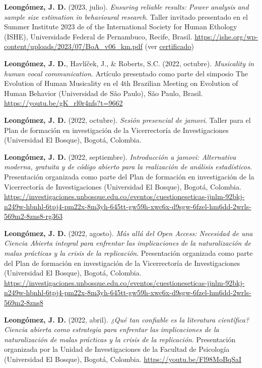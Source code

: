 \documentclass[11pt,a4paper,]{awesome-cv}
\begin{document}
\textbf{Leongómez, J. D.} (2023, julio). \emph{Ensuring reliable
results: Power analysis and sample size estimation in behavioural
research}. Taller invitado presentado en el Summer Institute 2023 de of
the International Society for Human Ethology (ISHE), Universidade
Federal de Pernambuco, Recife, Brasil.
\url{https://ishe.org/wp-content/uploads/2023/07/BoA_v06_km.pdf} (ver
\href{https://jdleongomez.info/es/files/Cert_ISHE_2023.pdf}{certificado})

\textbf{Leongómez, J. D.}, Havlíček, J., \& Roberts, S.C. (2022,
octubre). \emph{Musicality in human vocal communication}. Artículo
presentado como parte del simposio The Evolution of Human Musicality en
el 4th Brazilian Meeting on Evolution of Human Behavior (Universidad de
São Paulo), São Paulo, Brasil. \url{https://youtu.be/gK_rl0r4nfs?t=9662}

\textbf{Leongómez, J. D.} (2022, octubre). \emph{Sesión presencial de
jamovi}. Taller para el Plan de formación en investigación de la
Vicerrectoría de Investigaciones (Universidad El Bosque), Bogotá,
Colombia.

\textbf{Leongómez, J. D.} (2022, septiembre). \emph{Introducción a
jamovi: Alternativa moderna, gratuita y de código abierto para la
realización de análisis estadísticos}. Presentación organizada como
parte del Plan de formación en investigación de la Vicerrectoría de
Investigaciones (Universidad El Bosque), Bogotá, Colombia.
\url{https://investigaciones.unbosque.edu.co/eventos/cuestioneseticas-jjnlm-92bkj-n249w-hbnhl-6tpj4-pm22x-8m3yh-645tt-gw59h-xwc6x-d9sgw-6fzel-hm6dd-2wrls-569m2-8zns8-rg363}

\textbf{Leongómez, J. D.} (2022, agosto). \emph{Más allá del Open
Access: Necesidad de una Ciencia Abierta integral para enfrentar las
implicaciones de la naturalización de malas prácticas y la crisis de la
replicación}. Presentación organizada como parte del Plan de formación
en investigación de la Vicerrectoría de Investigaciones (Universidad El
Bosque), Bogotá, Colombia.
\url{https://investigaciones.unbosque.edu.co/eventos/cuestioneseticas-jjnlm-92bkj-n249w-hbnhl-6tpj4-pm22x-8m3yh-645tt-gw59h-xwc6x-d9sgw-6fzel-hm6dd-2wrls-569m2-8zns8}

\textbf{Leongómez, J. D.} (2022, abril). \emph{¿Qué tan confiable es la
literatura científica? Ciencia abierta como estrategia para enfrentar
las implicaciones de la naturalización de malas prácticas y la crisis de
la replicación}. Presentación organizada por la Unidad de
Investigaciones de la Facultad de Psicología (Universidad El Bosque),
Bogotá, Colombia. \url{https://youtu.be/Fl98MoBqSaI}
\end{document}
